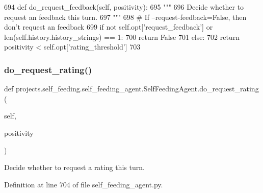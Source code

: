 \begin{DoxyCode}
694     \textcolor{keyword}{def }do\_request\_feedback(self, positivity):
695         \textcolor{stringliteral}{"""}
696 \textcolor{stringliteral}{        Decide whether to request an feedback this turn.}
697 \textcolor{stringliteral}{        """}
698         \textcolor{comment}{# If --request-feedback=False, then don't request an feedback}
699         \textcolor{keywordflow}{if} \textcolor{keywordflow}{not} self.opt[\textcolor{stringliteral}{'request\_feedback'}] \textcolor{keywordflow}{or} len(self.history.history\_strings) == 1:
700             \textcolor{keywordflow}{return} \textcolor{keyword}{False}
701         \textcolor{keywordflow}{else}:
702             \textcolor{keywordflow}{return} positivity < self.opt[\textcolor{stringliteral}{'rating\_threshold'}]
703 
\end{DoxyCode}
\mbox{\label{classprojects_1_1self__feeding_1_1self__feeding__agent_1_1SelfFeedingAgent_af0cd2239c4610157ac513163eb9437a3}} 
\subsubsection{\texorpdfstring{do\+\_\+request\+\_\+rating()}{do\_request\_rating()}}
{\footnotesize\ttfamily def projects.\+self\+\_\+feeding.\+self\+\_\+feeding\+\_\+agent.\+Self\+Feeding\+Agent.\+do\+\_\+request\+\_\+rating (\begin{DoxyParamCaption}\item[{}]{self,  }\item[{}]{positivity }\end{DoxyParamCaption})}

\begin{DoxyVerb}Decide whether to request a rating this turn.
\end{DoxyVerb}
 

Definition at line 704 of file self\+\_\+feeding\+\_\+agent.\+py.


